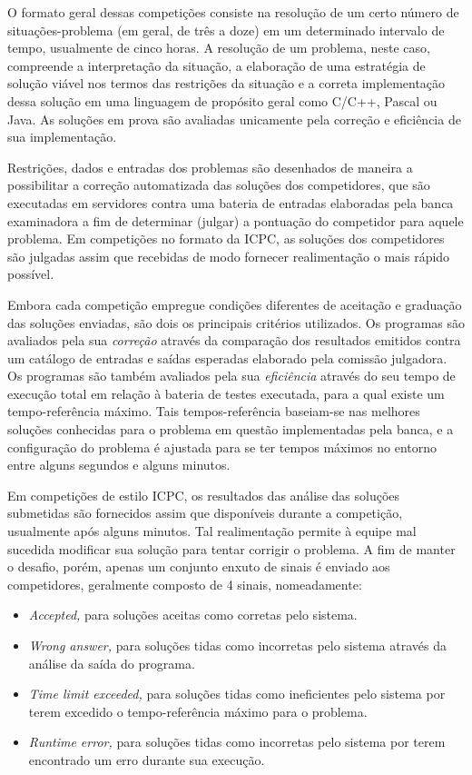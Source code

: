 \documentclass[ruledheader, 12pt]{abnt}
\begin{document}
O formato geral dessas competições consiste na resolução de um certo número de situações-problema (em geral, de três a doze) em um determinado intervalo de tempo, usualmente de cinco horas. A resolução de um problema, neste caso, compreende a interpretação da situação, a elaboração de uma estratégia de solução viável nos termos das restrições da situação e a correta implementação dessa solução em uma linguagem de propósito geral como C/C++, Pascal ou Java. As soluções em prova são avaliadas unicamente pela correção e eficiência de sua implementação. 

Restrições, dados e entradas dos problemas são desenhados de maneira a possibilitar a correção automatizada das soluções dos competidores, que são executadas em servidores contra uma bateria de entradas elaboradas pela banca examinadora a fim de determinar (julgar) a pontuação do competidor para aquele problema. Em competições no formato da ICPC, as soluções dos competidores são julgadas assim que recebidas de modo fornecer realimentação o mais rápido possível.

Embora cada competição empregue condições diferentes de aceitação e graduação das soluções enviadas, são dois os principais critérios utilizados. Os programas são avaliados pela sua \emph{correção} através da comparação dos resultados emitidos contra um catálogo de entradas e saídas esperadas elaborado pela comissão julgadora. Os programas são também avaliados pela sua \emph{eficiência} através do seu tempo de execução total em relação à bateria de testes executada, para a qual existe um tempo-referência máximo. Tais tempos-referência baseiam-se nas melhores soluções conhecidas para o problema em questão implementadas pela banca, e a configuração do problema é ajustada para se ter tempos máximos no entorno entre alguns segundos e alguns minutos.

Em competições de estilo ICPC, os resultados das análise das soluções submetidas são fornecidos assim que disponíveis durante a competição, usualmente após alguns minutos. Tal realimentação permite à equipe mal sucedida modificar sua solução para tentar corrigir o problema. A fim de manter o desafio, porém, apenas um conjunto enxuto de sinais é enviado aos competidores, geralmente composto de 4 sinais, nomeadamente:
\begin{itemize}
	\item \emph{Accepted,} para soluções aceitas como corretas pelo sistema.
	\item \emph{Wrong answer,} para soluções tidas como incorretas pelo sistema através da análise da saída do programa.
	\item \emph{Time limit exceeded,} para soluções tidas como ineficientes pelo sistema por terem excedido o tempo-referência máximo para o problema.
	\item \emph{Runtime error,} para soluções tidas como incorretas pelo sistema por terem encontrado um erro durante sua execução.
\end{itemize}
\end{document}

